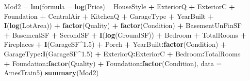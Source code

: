 \documentclass[
]{article}
\newenvironment{Shaded}{\begin{snugshade}}{\end{snugshade}}
\newcommand{\DataTypeTok}[1]{\textcolor[rgb]{0.13,0.29,0.53}{#1}}
\newcommand{\FloatTok}[1]{\textcolor[rgb]{0.00,0.00,0.81}{#1}}
\newcommand{\KeywordTok}[1]{\textcolor[rgb]{0.13,0.29,0.53}{\textbf{#1}}}
\newcommand{\NormalTok}[1]{#1}
\newcommand{\OperatorTok}[1]{\textcolor[rgb]{0.81,0.36,0.00}{\textbf{#1}}}
\newcommand{\StringTok}[1]{\textcolor[rgb]{0.31,0.60,0.02}{#1}}
\begin{document}
\begin{Shaded}
\begin{Highlighting}[]
\NormalTok{Mod2 =}\StringTok{ }\KeywordTok{lm}\NormalTok{(}\DataTypeTok{formula =} \KeywordTok{log}\NormalTok{(Price) }\OperatorTok{~}\StringTok{ }\NormalTok{HouseStyle }\OperatorTok{+}\StringTok{ }\NormalTok{ExteriorQ }\OperatorTok{+}\StringTok{ }\NormalTok{ExteriorC }\OperatorTok{+}\StringTok{ }
\StringTok{    }\NormalTok{Foundation }\OperatorTok{+}\StringTok{ }\NormalTok{CentralAir }\OperatorTok{+}\StringTok{ }\NormalTok{KitchenQ }\OperatorTok{+}\StringTok{ }\NormalTok{GarageType }\OperatorTok{+}\StringTok{ }\NormalTok{YearBuilt }\OperatorTok{+}\StringTok{ }
\StringTok{    }\KeywordTok{I}\NormalTok{(}\KeywordTok{log}\NormalTok{(LotArea)) }\OperatorTok{+}\StringTok{ }\KeywordTok{factor}\NormalTok{(Quality) }\OperatorTok{+}\StringTok{ }\KeywordTok{factor}\NormalTok{(Condition) }\OperatorTok{+}\StringTok{ }\NormalTok{BasementUnFinSF }\OperatorTok{+}\StringTok{ }
\StringTok{    }\NormalTok{BasementSF }\OperatorTok{+}\StringTok{ }\NormalTok{SecondSF }\OperatorTok{+}\StringTok{ }\KeywordTok{I}\NormalTok{(}\KeywordTok{log}\NormalTok{(GroundSF)) }\OperatorTok{+}\StringTok{ }\NormalTok{Bedroom }\OperatorTok{+}\StringTok{ }\NormalTok{TotalRooms }\OperatorTok{+}\StringTok{ }
\StringTok{    }\NormalTok{Fireplaces }\OperatorTok{+}\StringTok{ }\KeywordTok{I}\NormalTok{(GarageSF}\OperatorTok{^}\FloatTok{1.5}\NormalTok{) }\OperatorTok{+}\StringTok{ }\NormalTok{Porch }\OperatorTok{+}\StringTok{ }\NormalTok{YearBuilt}\OperatorTok{:}\KeywordTok{factor}\NormalTok{(Condition) }\OperatorTok{+}\StringTok{ }
\StringTok{    }\NormalTok{GarageType}\OperatorTok{:}\KeywordTok{I}\NormalTok{(GarageSF}\OperatorTok{^}\FloatTok{1.5}\NormalTok{) }\OperatorTok{+}\StringTok{ }\NormalTok{ExteriorQ}\OperatorTok{:}\NormalTok{ExteriorC }\OperatorTok{+}\StringTok{ }\NormalTok{Bedroom}\OperatorTok{:}\NormalTok{TotalRooms }\OperatorTok{+}\StringTok{ }
\StringTok{    }\NormalTok{Foundation}\OperatorTok{:}\KeywordTok{factor}\NormalTok{(Quality) }\OperatorTok{+}\StringTok{ }\NormalTok{Foundation}\OperatorTok{:}\KeywordTok{factor}\NormalTok{(Condition), }
    \DataTypeTok{data =}\NormalTok{ AmesTrain5)}
\KeywordTok{summary}\NormalTok{(Mod2)}
\end{Highlighting}
\end{Shaded}
\end{document}
